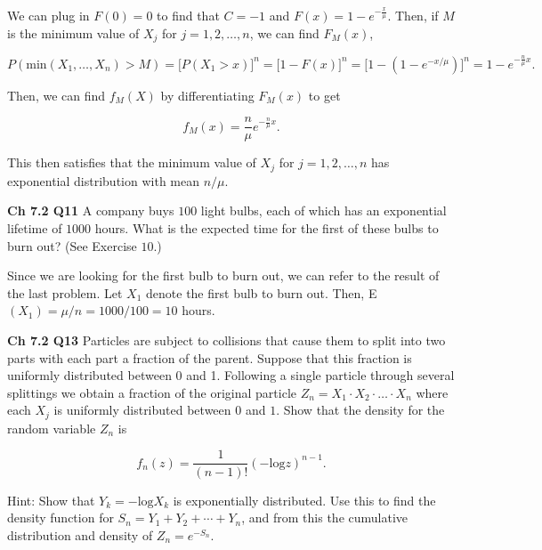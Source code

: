 \documentclass[12pt]{article}
\begin{document}
\noindent
We can plug in $F(0) = 0$ to find that $C = -1$ and $F(x) = 1 - e^{-\frac{x}{\mu}}$. Then, if $M$  is the minimum value of $X_j$ for $j = 1, 2, \ldots, n$, we can find $F_M(x)$, 

 \begin{equation*}
P( \text{min}(X_1, \ldots, X_n) > M ) = \big [ P(X_1 > x) \big ]^n = \big [ 1 - F(x) \big ]^n =  \big [ 1 - (1 - e^{- x / \mu }) \big ]^n = 1 - e^{ - \frac{n}{\mu} x }.
\end{equation*}

\noindent
Then, we can find $f_M(X)$ by differentiating $F_M(x)$ to get 

\begin{equation*}
f_M(x) = \frac{n}{\mu} e^{- \frac{n}{\mu} x }.
\end{equation*}

\noindent
This then satisfies that the minimum value of $X_j$ for $j = 1, 2, \ldots, n$ has exponential distribution with mean $n / \mu$.


\vspace*{.5cm}
\noindent
\textbf{Ch 7.2 Q11} A company buys $100$ light bulbs, each of which has an exponential lifetime of $1000$ hours. What is the expected time for the first of these bulbs to burn out? (See Exercise $10$.)

\vspace*{.5cm}
\noindent
Since we are looking for the first bulb to burn out, we can refer to the result of the last problem. Let $X_1$ denote the first bulb to burn out. Then, E$(X_1) = \mu / n = 1000 / 100 = 10$ hours. 

\vspace*{.5cm}
\noindent
\textbf{Ch 7.2 Q13} Particles are subject to collisions that cause them to split into two parts with each part a fraction of the parent. Suppose that this fraction is uniformly distributed between 0 and 1. Following a single particle through several splittings we obtain a fraction of the original particle $Z_n = X_1 \cdot X_2 \cdot \ldots \cdot X_n$ where each $X_j$ is uniformly distributed between $0$ and $1$. Show that the density for the random variable $Z_n$ is

\begin{equation*}
f_n(z) = \frac{1}{(n-1)!} (- \text{log} z)^{n-1}.
\end{equation*}

\noindent
Hint: Show that $Y_k = - \text{log} X_k$ is exponentially distributed. Use this to find the density function for $S_n = Y_1 + Y_2+ \cdots + Y_n$, and from this the cumulative distribution and density of $Z_n = e^{−S_n}$.
\end{document}
